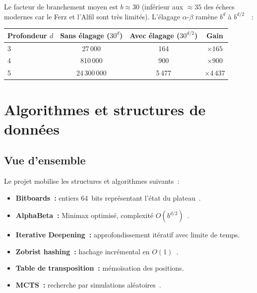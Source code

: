 \documentclass[a4paper,11pt]{article}
\begin{document}
Le facteur de branchement moyen est $b \approx 30$ (inférieur aux $\approx 35$
des échecs modernes car le Ferz et l'Alfil sont très limités). L'élagage
$\alpha$-$\beta$ ramène $b^d$ à $b^{d/2}$~\cite{Knuth1975,RussellNorvig2020}~:

\begin{center}
\begin{tabular}{lccc}
\toprule
Profondeur $d$ & Sans élagage ($30^d$) & Avec élagage ($30^{d/2}$) & Gain \\
\midrule
3 & 27\,000      & 164    & $\times 165$ \\
4 & 810\,000     & 900    & $\times 900$ \\
5 & 24\,300\,000 & 5\,477 & $\times 4\,437$ \\
\bottomrule
\end{tabular}
\end{center}

\section{Algorithmes et structures de données}
\label{sec:algo}

\subsection{Vue d'ensemble}

Le projet mobilise les structures et algorithmes suivants~:

\begin{itemize}[noitemsep]
  \item \textbf{Bitboards~:} entiers 64~bits représentant l'état du plateau~\cite{Shannon1950}.
  \item \textbf{AlphaBeta~:} Minimax optimisé, complexité $O(b^{d/2})$~\cite{Knuth1975}.
  \item \textbf{Iterative Deepening~:} approfondissement itératif avec limite de temps.
  \item \textbf{Zobrist hashing~:} hachage incrémental en $O(1)$~\cite{Zobrist1970}.
  \item \textbf{Table de transposition~:} mémoïsation des positions.
  \item \textbf{MCTS~:} recherche par simulations aléatoires~\cite{Browne2012}.
\end{itemize}
\end{document}
